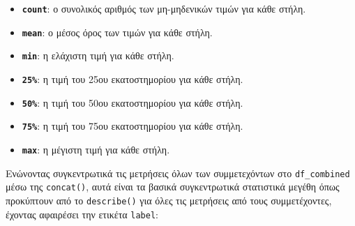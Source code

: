         \vspace{-3mm}
        \begin{itemize}[label={\tiny\blacksquare}]
            \addtolength\itemsep{-3mm}
            \item \texttt{\textbf{count}}: ο συνολικός αριθμός των μη-μηδενικών τιμών για κάθε στήλη.
            \item \texttt{\textbf{mean}}: ο μέσος όρος των τιμών για κάθε στήλη.
            \item \texttt{\textbf{min}}: η ελάχιστη τιμή για κάθε στήλη.
            \item \texttt{\textbf{25\%}}: η τιμή του 25ου εκατοστημορίου για κάθε στήλη.
            \item \texttt{\textbf{50\%}}: η τιμή του 50ου εκατοστημορίου για κάθε στήλη.
            \item \texttt{\textbf{75\%}}: η τιμή του 75ου εκατοστημορίου για κάθε στήλη.
            \item \texttt{\textbf{max}}: η μέγιστη τιμή για κάθε στήλη.
        \end{itemize}

        Ενώνοντας συγκεντρωτικά τις μετρήσεις όλων των συμμετεχόντων στο \texttt{df\_combined} μέσω της \texttt{concat()},
        αυτά είναι τα βασικά συγκεντρωτικά στατιστικά μεγέθη όπως προκύπτουν από το \texttt{describe()}
        για όλες τις μετρήσεις από τους συμμετέχοντες, έχοντας αφαιρέσει την ετικέτα \texttt{label}:

        \begin{table}[ht] \noindent\centering\tt
        \end{table}

